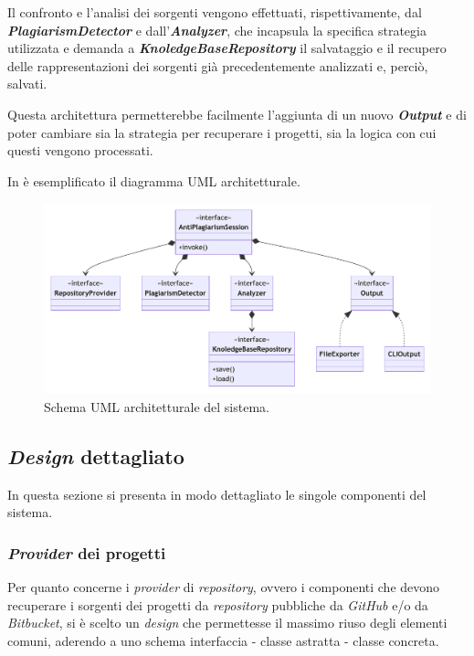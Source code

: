Il confronto e l'analisi dei sorgenti vengono effettuati, rispettivamente, dal \textbf{\textit{PlagiarismDetector}} e dall'\textbf{\textit{Analyzer}}, che incapsula la specifica strategia utilizzata e demanda a \textbf{\textit{KnoledgeBaseRepository}} il salvataggio e il recupero delle rappresentazioni dei sorgenti già precedentemente analizzati e, perciò, salvati.

Questa architettura permetterebbe facilmente l'aggiunta di un nuovo \textbf{\textit{Output}} e di poter cambiare sia la strategia per recuperare i progetti, sia la logica con cui questi vengono processati.

In  è esemplificato il diagramma UML architetturale.

\begin{figure}[h!]
    \centering
    \includegraphics[width=\textwidth]{resources/img/02-achitecture.pdf}
    \caption{Schema UML architetturale del sistema.}
    \label{img:02-architecture}
\end{figure}

\subsection{\textit{Design} dettagliato}
In questa sezione si presenta in modo dettagliato le singole componenti del sistema.

\subsubsection*{\textit{Provider} dei progetti}
Per quanto concerne i \textit{provider} di \textit{repository}, ovvero i componenti che devono recuperare i sorgenti dei progetti da \textit{repository} pubbliche da \textit{GitHub} e/o da \textit{Bitbucket}, si è scelto un \textit{design} che permettesse il massimo riuso degli elementi comuni, aderendo a uno schema interfaccia - classe astratta - classe concreta.

